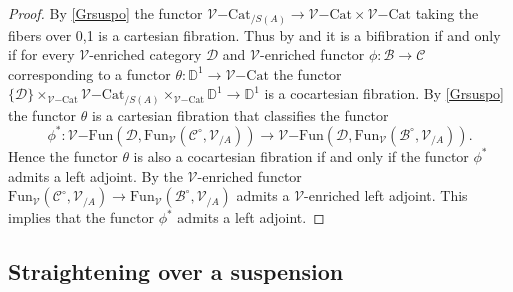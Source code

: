 \documentclass[10pt,oneside]{article}
\numberwithin{equation}{section} %
\numberwithin{figure}{section} %
\theoremstyle{plain}
\theoremstyle{definition}
\newcommand{\bD}{{\mathbb D}}
\newcommand{\mB}{{\mathcal B}}
\newcommand{\mC}{{\mathcal C}}
\newcommand{\mD}{{\mathcal D}}
\newcommand{\mV}{{\mathcal V}}
\newcommand{\Cat}{\mathrm{Cat}}
\newcommand{\Fun}{\mathrm{Fun}}
\begin{document}
\begin{proof}

By \cref{Grsuspo} the functor ${\mV\mathrm{-}\Cat_{/S(A)}} \to {\mV\mathrm{-}\Cat} \times {\mV\mathrm{-}\Cat} $ taking the fibers over 0,1 is a cartesian fibration.
Thus by \cite[Corollary 5.2.2.4.]{lurie.HTT} and \cite[Lemma 2.42.]{heine2023monadicity} it is a bifibration if and only if for every $\mV$-enriched category $\mD$ and $\mV$-enriched functor $\phi: \mB \to \mC$ corresponding to a functor $\theta: \bD^1 \to {\mV\mathrm{-}\Cat}$
the functor $\{\mD\} \times_{{\mV\mathrm{-}\Cat}} {\mV\mathrm{-}\Cat_{/S(A)}} \times_{{\mV\mathrm{-}\Cat}} \bD^1 \to \bD^1 $ is a cocartesian fibration. 
By \cref{Grsuspo} the functor $\theta$ is a cartesian fibration that classifies the functor
$$\phi^* : {\mV\mathrm{-}\Fun}(\mD, {\Fun_\mV}(\mC^\circ,\mV_{/A})) \to {\mV\mathrm{-}\Fun}(\mD, {\Fun_\mV}(\mB^\circ,\mV_{/A})). $$
Hence the functor $\theta$ is also a cocartesian fibration if and only 
if the functor $\phi^*$ admits a left adjoint.
By \cite[Proposition 5.20.]{heine2024bienriched} the $\mV$-enriched functor 
$ {\Fun_\mV}(\mC^\circ,\mV_{/A}) \to {\Fun_\mV}(\mB^\circ,\mV_{/A})$
admits a $\mV$-enriched left adjoint. This implies that the functor
$\phi^*$ admits a left adjoint.
\end{proof}



\subsection{Straightening over a suspension}
\end{document}
